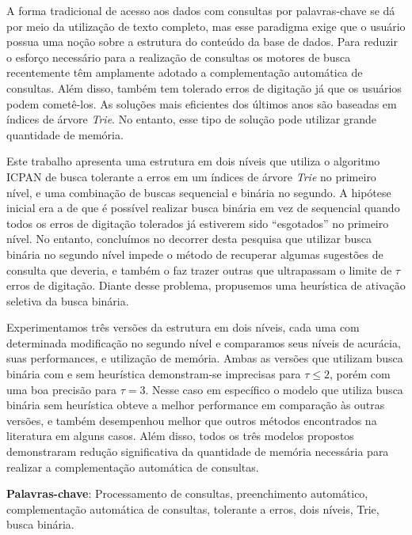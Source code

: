 \documentclass[
    article,
	12pt,				%
	openright,			%
	twoside,			%
	a4paper,			%
	english,			%
	spanish,			%
	brazil,				%
	]{abntex2}
\begin{document}
\begin{resumo}
A forma tradicional de acesso aos dados com consultas por palavras-chave se dá por meio da utilização de texto completo, mas esse paradigma exige que o usuário possua uma noção sobre a estrutura do conteúdo da base de dados. Para reduzir o esforço necessário para a realização de consultas os motores de busca recentemente têm amplamente adotado a complementação automática de consultas. Além disso, também tem tolerado erros de digitação já que os usuários podem cometê-los. As soluções mais eficientes dos últimos anos são baseadas em índices de árvore \textit{Trie}. No entanto, esse tipo de solução pode utilizar grande quantidade de memória.

Este trabalho apresenta uma estrutura em dois níveis que utiliza o algoritmo ICPAN de busca tolerante a erros em um índices de árvore \textit{Trie} no primeiro nível, e uma combinação de buscas sequencial e binária no segundo. A hipótese inicial era a de que é possível realizar busca binária em vez de sequencial quando todos os erros de digitação tolerados já estiverem sido ``esgotados'' no primeiro nível. No entanto, concluímos no decorrer desta pesquisa que utilizar busca binária no segundo nível impede o método de recuperar algumas sugestões de consulta que deveria, e também o faz trazer outras que ultrapassam o limite de $\tau$ erros de digitação. Diante desse problema, propusemos uma heurística de ativação seletiva da busca binária. 

Experimentamos três versões da estrutura em dois níveis, cada uma com determinada modificação no segundo nível e comparamos seus níveis de acurácia, suas performances, e utilização de memória. Ambas as versões que utilizam busca binária com e sem heurística demonstram-se imprecisas para $\tau \leq 2$, porém com uma boa precisão para $\tau=3$. Nesse caso em específico o modelo que utiliza busca binária sem heurística obteve a melhor performance em comparação às outras versões, e também desempenhou melhor que outros métodos encontrados na literatura em alguns casos. Além disso, todos os três modelos propostos demonstraram redução significativa da quantidade de memória necessária para realizar a complementação automática de consultas.

\vspace{\onelineskip}
\noindent
\textbf{Palavras-chave}: Processamento de consultas, preenchimento automático, complementação automática de consultas, tolerante a erros, dois níveis, Trie, busca binária.
 

\end{resumo}
\end{document}
